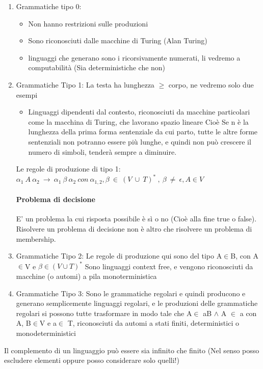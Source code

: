 \documentclass[12pt, a4paper, openany, oneside]{book}
\begin{document}
\begin{enumerate}
	\item Grammatiche tipo 0: %
	\begin{itemize}
		\item Non hanno restrizioni sulle produzioni
		\item Sono riconosciuti dalle macchine di Turing (Alan Turing)
		\item linguaggi che generano sono i ricorsivamente numerati, li vedremo a 
		computabilità (Sia deterministiche che non)
	\end{itemize}
	\item Grammatiche Tipo 1: La testa ha lunghezza $\geq$ corpo, ne vedremo 
	solo due esempi
	\begin{itemize}
		\item Linguaggi dipendenti dal contesto, riconosciuti da macchine 
		particolari come la macchina di Turing, che lavorano spazio lineare
		Cioè Se n è la lunghezza della prima forma sentenziale da cui parto, 
		tutte le altre forme sentenziali non potranno essere più lunghe, e quindi
		non può crescere il numero di simboli, tenderà sempre a diminuire.
	\end{itemize}
	Le regole di produzione di tipo 1:
	$\alpha _{1} ~ A ~ \alpha _{2} ~ \to ~ \alpha _{1}~ \beta ~ \alpha_{2} ~ con ~ \alpha _{1,2}
	,\beta ~ \in ~ (V ~ \cup ~ T)^{*} ~ , ~ \beta ~ \neq ~ \epsilon, A\in V$
	\paragraph{Problema di decisione} E' un problema la cui risposta possibile è
	sì o no (Cioè alla fine true o false). Risolvere un problema di decisione non 
	è altro che risolvere un problema di membership.
	\item Grammatiche Tipo 2: 
	Le regole di produzione qui sono del tipo A$\in$B, con A$\in$V e 
	$\beta \in(V \cup T)^{*}$
	Sono linguaggi context free, e vengono riconosciuti da macchine (o automi) a
	pila monoterministica
	\item Grammatiche Tipo 3: Sono le grammatiche regolari e quindi producono e
	generano semplicemente linguaggi regolari, e le produzioni delle grammatiche
	regolari si possono tutte trasformare in modo tale che A$\in$ aB $\wedge$ A
	$\in$ a con A, B$\in$V e a$\in$ T, riconosciuti da automi a stati finiti, 
	deterministici o monodeterministici
\end{enumerate}
Il complemento di un linguaggio può essere sia infinito che finito (Nel senso
posso escludere elementi oppure posso considerare solo quelli!)
\\ \\ 
\end{document}
